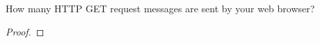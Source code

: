 \documentclass[../../main.tex]{subfiles}
\begin{document}
\begin{wts}
How many HTTP GET request messages are sent by your web browser?  
\end{wts}
\begin{proof}

\end{proof}
\end{document}

